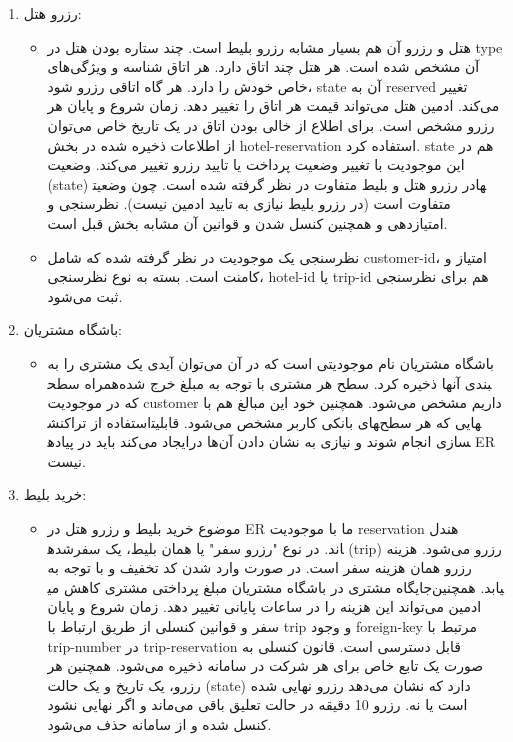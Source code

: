 \begin{enumerate}
\begin{itemize}
	\end{itemize}
	\item رزرو هتل:
	\begin{itemize}
		\item 
		هتل و رزرو آن هم بسیار مشابه رزرو بلیط است. چند ستاره بودن هتل در type آن مشخص شده است. هر هتل چند اتاق دارد. هر اتاق شناسه و ویژگی‌های خاص خودش را دارد. هر گاه اتاقی رزرو شود، state آن به reserved تغییر می‌کند. ادمین هتل می‌تواند قیمت هر اتاق را تغییر دهد. زمان شروع و پایان هر رزرو مشخص است. برای اطلاع از خالی بودن اتاق در یک تاریخ خاص می‌توان از اطلاعات ذخیره شده در بخش hotel-reservation استفاده کرد. state هم در این موجودیت با تغییر وضعیت پرداخت یا تایید رزرو تغییر می‌کند.
		وضعیت (state) در رزرو هتل و بلیط متفاوت در نظر گرفته شده‌ است. چون وضعیت‎ها متفاوت است (در رزرو بلیط نیازی به تایید ادمین نیست).
		نظرسنجی و امتیازدهی و همچنین کنسل شدن و قوانین آن مشابه بخش قبل است.
		\item 
		نظرسنجی یک موجودیت در نظر گرفته شده که شامل customer-id، امتیاز و کامنت است. بسته به نوع نظرسنجی، hotel-id یا trip-id هم برای نظرسنجی ثبت می‌شود.
	\end{itemize}
	\pagebreak
	\item باشگاه مشتریان:
	\begin{itemize}
		\item 
		باشگاه مشتریان نام موجودیتی است که در آن می‌توان آیدی یک مشتری را به همراه سطح‎بندی آنها ذخیره کرد. سطح هر مشتری با توجه به مبلغ خرج شده که در موجودیت customer داریم مشخص می‌شود. همچنین خود این مبالغ هم با استفاده از تراکنش‎های بانکی کاربر مشخص می‌شود.
		قابلیت‎هایی که هر سطح ایجاد می‌کند باید در پیاده‎سازی انجام شوند و نیازی به نشان دادن آن‌ها در ER نیست.
	\end{itemize}
	\item خرید بلیط:
	\begin{itemize}
		\item 
موضوع خرید بلیط و رزرو هتل در ER ما با موجودیت reservation هندل شده‎اند. در نوع "رزرو سفر" یا همان بلیط، یک سفر (trip) رزرو می‌شود. هزینه رزرو همان هزینه سفر است. در صورت وارد شدن کد تخفیف و با توجه به جایگاه مشتری در باشگاه مشتریان مبلغ پرداختی مشتری کاهش می‎یابد. همچنین ادمین می‌تواند این هزینه را در ساعات پایانی تغییر دهد. زمان شروع و پایان سفر و قوانین کنسلی از طریق ارتباط با trip و وجود foreign-key مرتبط با trip-number در trip-reservation قابل دسترسی است. قانون کنسلی به صورت یک تابع خاص برای هر شرکت در سامانه ذخیره می‌شود. همچنین هر رزرو، یک تاریخ و یک حالت (state) دارد که نشان می‌دهد رزرو نهایی شده است یا نه. رزرو 10 دقیقه در حالت تعلیق باقی می‌ماند و اگر نهایی نشود کنسل شده و از سامانه حذف می‌شود.

\end{itemize}
\end{enumerate}
